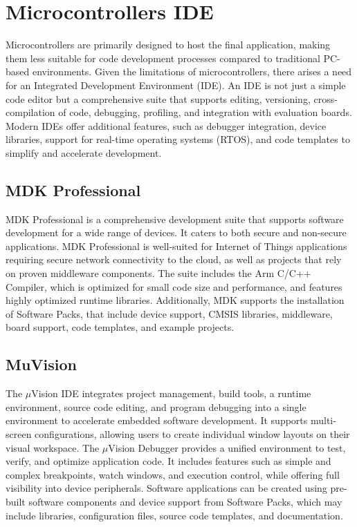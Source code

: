 \section{Microcontrollers IDE}

Microcontrollers are primarily designed to host the final application, making them less suitable for code development processes compared to traditional PC-based environments. 
Given the limitations of microcontrollers, there arises a need for an Integrated Development Environment (IDE). 
An IDE is not just a simple code editor but a comprehensive suite that supports editing, versioning, cross-compilation of code, debugging, profiling, and integration with evaluation boards. 
Modern IDEs offer additional features, such as debugger integration, device libraries, support for real-time operating systems (RTOS), and code templates to simplify and accelerate development.

\subsection{MDK Professional}
MDK Professional is a comprehensive development suite that supports software development for a wide range of devices. 
It caters to both secure and non-secure applications.
MDK Professional is well-suited for Internet of Things applications requiring secure network connectivity to the cloud, as well as projects that rely on proven middleware components. 
The suite includes the Arm C/C++ Compiler, which is optimized for small code size and performance, and features highly optimized runtime libraries.
Additionally, MDK supports the installation of Software Packs, that include device support, CMSIS libraries, middleware, board support, code templates, and example projects. 

\subsection{MuVision}
The $\mu$Vision IDE integrates project management, build tools, a runtime environment, source code editing, and program debugging into a single environment to accelerate embedded software development.
It supports multi-screen configurations, allowing users to create individual window layouts on their visual workspace.
The $\mu$Vision Debugger provides a unified environment to test, verify, and optimize application code. 
It includes features such as simple and complex breakpoints, watch windows, and execution control, while offering full visibility into device peripherals. 
Software applications can be created using pre-built software components and device support from Software Packs, which may include libraries, configuration files, source code templates, and documentation.

